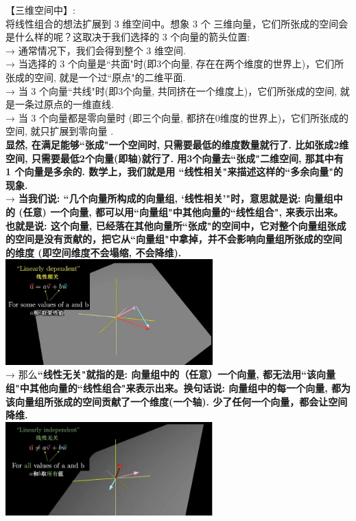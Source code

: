 \documentclass[UTF8]{ctexart}
\begin{document}
【三维空间中】:\\
将线性组合的想法扩展到 3 维空间中。想象 3 个 三维向量，它们所张成的空间会是什么样的呢？这取决于我们选择的 3 个向量的箭头位置:\\

→ 通常情况下，我们会得到整个 3 维空间. \\
→ 当选择的 3 个向量是``共面"时(即3个向量, 存在在两个维度的世界上)，它们所张成的空间, 就是一个过``原点"的二维平面. \\
→ 当 3 个向量``共线"时(即3个向量, 共同挤在一个维度上)，它们所张成的空间, 就是一条过原点的一维直线. \\
→ 当 3 个向量都是零向量时 (即三个向量, 都挤在0维度的世界上)，它们所张成的空间, 就只扩展到零向量 .\\

\textbf{显然, 在满足能够``张成"一个空间时, 只需要最低的维度数量就行了. 比如张成2维空间, 只需要最低2个向量(即轴)就行了. 用3个向量去``张成"二维空间, 那其中有 1 个向量是多余的.  数学上，我们就是用 \hypertarget{超链接定位符}{``线性相关"}来描述这样的``多余向量"的现象.}  \\

→ \textbf{当我们说: ``几个向量所构成的向量组, `线性相关'"时，意思就是说: 向量组中的 (任意) 一个向量, 都可以用``向量组"中其他向量的``线性组合", 来表示出来。也就是说: 这个向量, 已经落在其他向量所``张成"的空间中，它对整个向量组张成的空间是没有贡献的，把它从``向量组"中拿掉，并不会影响向量组所张成的空间的维度 (即空间维度不会塌缩, 不会降维). \\}
\includegraphics[width=0.6\textwidth]{img/0107.png}\\

→ 那么\textbf{``线性无关"就指的是: 向量组中的（任意）一个向量, 都无法用``该向量组"中其他向量的``线性组合"来表示出来。换句话说: 向量组中的每一个向量, 都为该向量组所张成的空间贡献了一个维度(一个轴). 少了任何一个向量，都会让空间降维.}\\
\includegraphics[width=0.6\textwidth]{img/0108.png}\\
\end{document}
